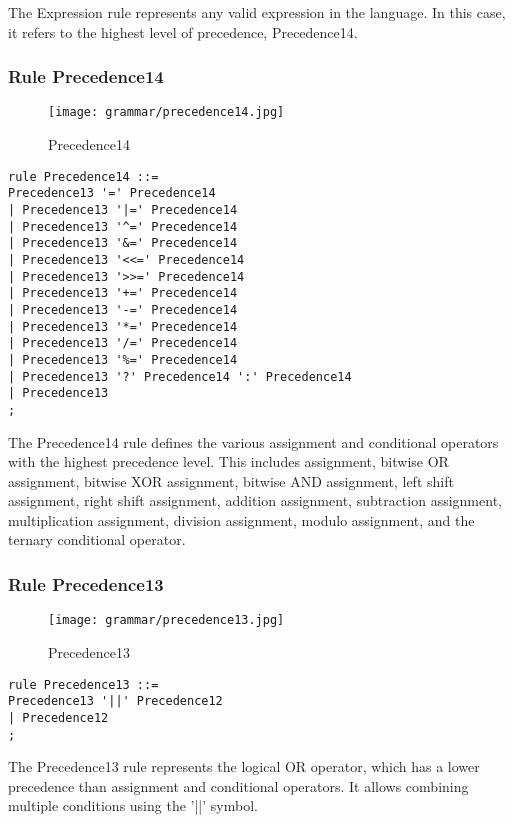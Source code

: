 The Expression rule represents any valid expression in the language. In this case, it refers to the highest level of precedence, Precedence14.

\subsubsection*{Rule Precedence14}

\begin{figure}[!ht]
\centering
\texttt{[image: grammar/precedence14.jpg]}
\caption{Precedence14}
\end{figure}

\begin{lstlisting}
rule Precedence14 ::=
Precedence13 '=' Precedence14
| Precedence13 '|=' Precedence14
| Precedence13 '^=' Precedence14
| Precedence13 '&=' Precedence14
| Precedence13 '<<=' Precedence14
| Precedence13 '>>=' Precedence14
| Precedence13 '+=' Precedence14
| Precedence13 '-=' Precedence14
| Precedence13 '*=' Precedence14
| Precedence13 '/=' Precedence14
| Precedence13 '%=' Precedence14
| Precedence13 '?' Precedence14 ':' Precedence14
| Precedence13
;
\end{lstlisting}

The Precedence14 rule defines the various assignment and conditional operators with the highest precedence level. This includes assignment, bitwise OR assignment, bitwise XOR assignment, bitwise AND assignment, left shift assignment, right shift assignment, addition assignment, subtraction assignment, multiplication assignment, division assignment, modulo assignment, and the ternary conditional operator.

\subsubsection*{Rule Precedence13}

\begin{figure}[!ht]
\centering
\texttt{[image: grammar/precedence13.jpg]}
\caption{Precedence13}
\end{figure}

\begin{lstlisting}
rule Precedence13 ::=
Precedence13 '||' Precedence12
| Precedence12
;
\end{lstlisting}

The Precedence13 rule represents the logical OR operator, which has a lower precedence than assignment and conditional operators. It allows combining multiple conditions using the '||' symbol.


